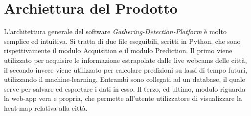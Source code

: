 \chapter{Archiettura del Prodotto}\label{ArchitetturaDelProdotto}
L'architettura generale del software \textit{Gathering-Detection-Platform} è molto semplice ed intuitiva.
Si tratta di due file eseguibili, scritti in Python, che sono rispettivamente il modulo Acquisition e il modulo Prediction.
Il primo viene utilizzato per acquisire le informazione estrapolate dalle live webcams delle città, il secondo invece viene utilizzato per calcolare predizioni su lassi di tempo futuri, utilizzando il machine-learning.
Entrambi sono collegati ad un database, il quale serve per salvare ed esportare i dati in esso.
Il terzo, ed ultimo, modulo riguarda la web-app vera e propria, che permette all'utente utilizzatore di visualizzare la heat-map relativa alla città.
